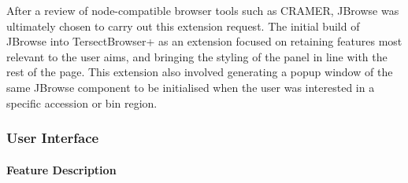 \documentclass[12pt]{article}
\begin{document}
After a review of node-compatible browser tools such as CRAMER, JBrowse was ultimately chosen to carry out this extension request. The initial build of JBrowse into TersectBrowser+ as an extension focused on retaining features most relevant to the user aims, and bringing the styling of the panel in line with the rest of the page. This extension also involved generating a popup window of the same JBrowse component to be initialised when the user was interested in a specific accession or bin region. 

\subsubsection{User Interface}

\paragraph{Feature Description}
\end{document}
